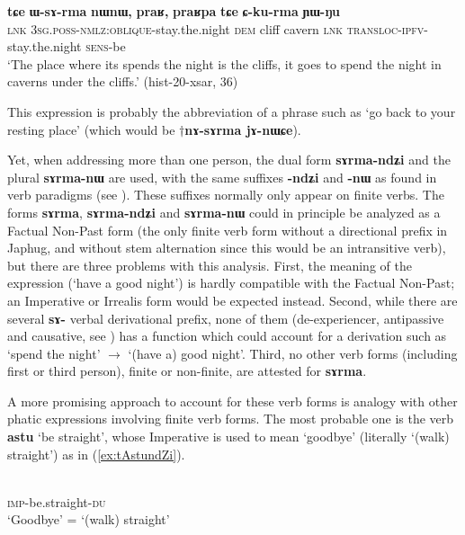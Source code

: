 \documentclass[11pt]{article}
\newcommand{\ipa}[1]{{\phon\textbf{#1}}}
\newcommand{\refb}[1]{(\ref{#1})}
\begin{document}
\begin{exe}
\ex \label{ex:Ckurma}
\gll 
\ipa{tɕe}	\ipa{ɯ-sɤ-rma}	\ipa{nɯnɯ,}	\ipa{praʁ,}	\ipa{praʁpa}	\ipa{tɕe}	\ipa{ɕ-ku-rma}	\ipa{ɲɯ-ŋu} \\
\textsc{lnk} \textsc{3sg.poss-nmlz:oblique}-stay.the.night \textsc{dem} cliff cavern \textsc{lnk} \textsc{transloc-ipfv}-stay.the.night \textsc{sens}-be \\
\glt `The place where its spends the night is the cliffs, it goes to spend the night in caverns under the cliffs.' (hist-20-xsar, 36)
\end{exe}

This expression is probably the abbreviation of a phrase such as `go back to your resting place' (which would be $\dagger$\ipa{nɤ-sɤrma jɤ-nɯɕe}).

Yet, when addressing more than one person, the dual form  \ipa{sɤrma-ndʑi} and the plural  \ipa{sɤrma-nɯ} are used, with the same suffixes \ipa{-ndʑi} and \ipa{-nɯ} as found in verb paradigms (see \citealt{jacques17sketch}). These suffixes normally only appear on finite verbs. The forms \ipa{sɤrma}, \ipa{sɤrma-ndʑi} and \ipa{sɤrma-nɯ} could in principle be analyzed as a Factual Non-Past form (the only finite verb form without a directional prefix in Japhug, and without stem alternation since this would be an intransitive verb), but there are three problems with this analysis. First, the meaning of the expression (`have a good night') is hardly compatible with the Factual Non-Past; an Imperative or Irrealis form would be expected instead. Second, while there are several \ipa{sɤ-} verbal derivational prefix, none of them (de-experiencer, antipassive and causative, see \citealt{jacques14antipassive}) has a function which could account for a derivation such as `spend the night' $\rightarrow$ `(have a) good night'. Third, no other verb forms (including first or third person), finite or non-finite, are attested for \ipa{sɤrma}. 

A more promising approach to account for these verb forms is analogy with other phatic expressions involving finite verb forms. The most probable one is the verb \ipa{astu} `be straight', whose Imperative is used to mean `goodbye' (literally `(walk) straight') as in \refb{ex:tAstundZi}.

\begin{exe}
\ex \label{ex:tAstundZi}
\gll \ipa{tɤ-ɤstu-ndʑi} \\
\textsc{imp}-be.straight-\textsc{du} \\
\glt `Goodbye' = `(walk) straight'
\end{exe}
\end{document}
